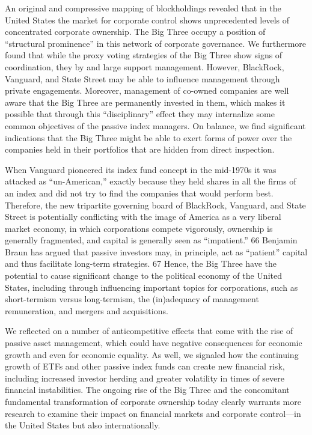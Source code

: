 \documentclass[
]{book}
\begin{document}
An original and compressive mapping of blockholdings revealed that in the United States the market for corporate control shows unprecedented levels of concentrated corporate ownership. The Big Three occupy a position of ``structural prominence'' in this network of corporate governance. We furthermore found that while the proxy voting strategies of the Big Three show signs of coordination, they by and large support management. However, BlackRock, Vanguard, and State Street may be able to influence management through private engagements. Moreover, management of co-owned companies are well aware that the Big Three are permanently invested in them, which makes it possible that through this ``disciplinary'' effect they may internalize some common objectives of the passive index managers. On balance, we find significant indications that the Big Three might be able to exert forms of power over the companies held in their portfolios that are hidden from direct inspection.

When Vanguard pioneered its index fund concept in the mid-1970s it was attacked as ``un-American,'' exactly because they held shares in all the firms of an index and did not try to find the companies that would perform best. Therefore, the new tripartite governing board of BlackRock, Vanguard, and State Street is potentially conflicting with the image of America as a very liberal market economy, in which corporations compete vigorously, ownership is generally fragmented, and capital is generally seen as ``impatient.'' 66 Benjamin Braun has argued that passive investors may, in principle, act as ``patient'' capital and thus facilitate long-term strategies. 67 Hence, the Big Three have the potential to cause significant change to the political economy of the United States, including through influencing important topics for corporations, such as short-termism versus long-termism, the (in)adequacy of management remuneration, and mergers and acquisitions.

We reflected on a number of anticompetitive effects that come with the rise of passive asset management, which could have negative consequences for economic growth and even for economic equality. As well, we signaled how the continuing growth of ETFs and other passive index funds can create new financial risk, including increased investor herding and greater volatility in times of severe financial instabilities. The ongoing rise of the Big Three and the concomitant fundamental transformation of corporate ownership today clearly warrants more research to examine their impact on financial markets and corporate control---in the United States but also internationally.
\end{document}
